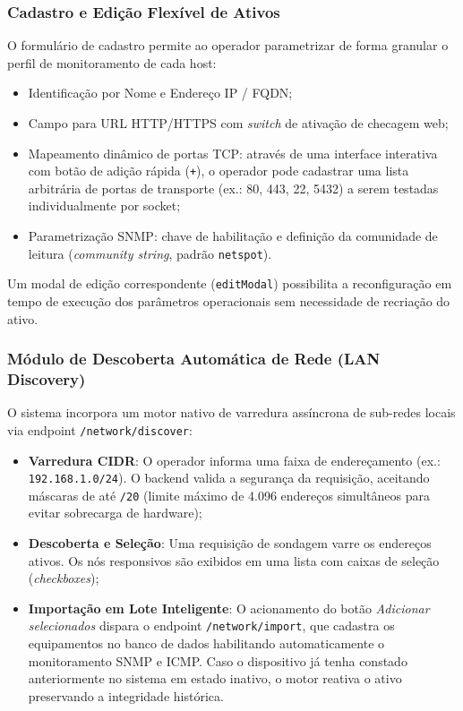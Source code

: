 \documentclass[12pt,a4paper]{article}
\begin{document}
\subsubsection{Cadastro e Edição Flexível de Ativos}
O formulário de cadastro permite ao operador parametrizar de forma granular o perfil de monitoramento de cada host:
\begin{itemize}[leftmargin=1.25cm]
\item Identificação por Nome e Endereço IP / FQDN;
\item Campo para URL HTTP/HTTPS com \textit{switch} de ativação de checagem web;
\item Mapeamento dinâmico de portas TCP: através de uma interface interativa com botão de adição rápida (\texttt{+}), o operador pode cadastrar uma lista arbitrária de portas de transporte (ex.: 80, 443, 22, 5432) a serem testadas individualmente por socket;
\item Parametrização SNMP: chave de habilitação e definição da comunidade de leitura (\textit{community string}, padrão \texttt{netspot}).
\end{itemize}
Um modal de edição correspondente (\texttt{editModal}) possibilita a reconfiguração em tempo de execução dos parâmetros operacionais sem necessidade de recriação do ativo.

\subsubsection{Módulo de Descoberta Automática de Rede (LAN Discovery)}
O sistema incorpora um motor nativo de varredura assíncrona de sub-redes locais via endpoint \texttt{/network/discover}:
\begin{itemize}[leftmargin=1.25cm]
\item \textbf{Varredura CIDR}: O operador informa uma faixa de endereçamento (ex.: \texttt{192.168.1.0/24}). O backend valida a segurança da requisição, aceitando máscaras de até \texttt{/20} (limite máximo de 4.096 endereços simultâneos para evitar sobrecarga de hardware);
\item \textbf{Descoberta e Seleção}: Uma requisição de sondagem varre os endereços ativos. Os nós responsivos são exibidos em uma lista com caixas de seleção (\textit{checkboxes});
\item \textbf{Importação em Lote Inteligente}: O acionamento do botão \textit{Adicionar selecionados} dispara o endpoint \texttt{/network/import}, que cadastra os equipamentos no banco de dados habilitando automaticamente o monitoramento SNMP e ICMP. Caso o dispositivo já tenha constado anteriormente no sistema em estado inativo, o motor reativa o ativo preservando a integridade histórica.
\end{itemize}
\end{document}
